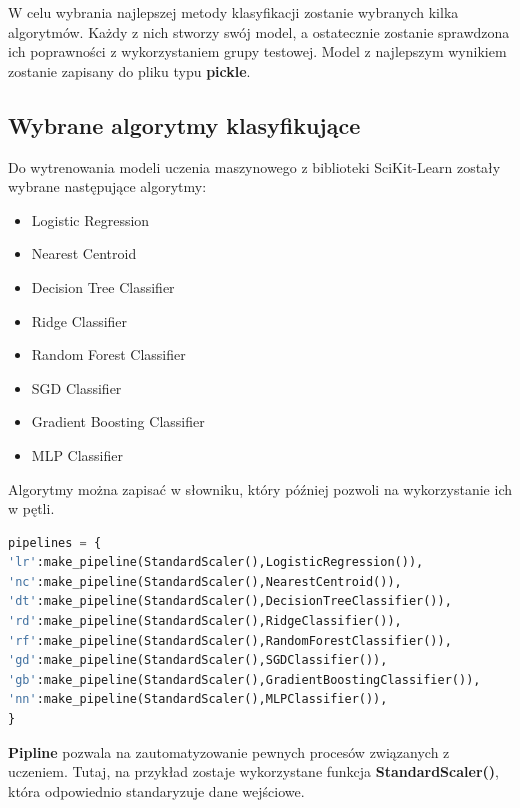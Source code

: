 \quad W celu wybrania najlepszej metody klasyfikacji zostanie wybranych kilka algorytmów. Każdy z nich stworzy swój model, a ostatecznie zostanie sprawdzona ich poprawności z wykorzystaniem grupy testowej. Model z najlepszym wynikiem zostanie zapisany do pliku typu \textbf{pickle}.

\subsection{Wybrane algorytmy klasyfikujące}

\quad Do wytrenowania modeli uczenia maszynowego z biblioteki SciKit-Learn \cite{bib:ml} zostały wybrane następujące algorytmy:

\begin{itemize}
    \item Logistic Regression %
    \item Nearest Centroid 
    \item Decision Tree Classifier
    \item Ridge Classifier 
    \item Random Forest Classifier 
    \item SGD Classifier
    \item Gradient Boosting Classifier
    \item MLP Classifier
\end{itemize}

\quad Algorytmy można zapisać w słowniku, który później pozwoli na wykorzystanie ich w pętli. \newline

\begin{lstlisting}[language=python, style=programming, captionpos=b, caption={Funkcja zwracająca rozpoznany gest}]
pipelines = {
'lr':make_pipeline(StandardScaler(),LogisticRegression()),
'nc':make_pipeline(StandardScaler(),NearestCentroid()),
'dt':make_pipeline(StandardScaler(),DecisionTreeClassifier()),
'rd':make_pipeline(StandardScaler(),RidgeClassifier()),
'rf':make_pipeline(StandardScaler(),RandomForestClassifier()),
'gd':make_pipeline(StandardScaler(),SGDClassifier()),
'gb':make_pipeline(StandardScaler(),GradientBoostingClassifier()),
'nn':make_pipeline(StandardScaler(),MLPClassifier()),
}
\end{lstlisting}

\quad \textbf{Pipline} pozwala na zautomatyzowanie pewnych procesów związanych z uczeniem. Tutaj, na przykład zostaje wykorzystane funkcja \textbf{StandardScaler()}, która odpowiednio standaryzuje dane wejściowe. 

